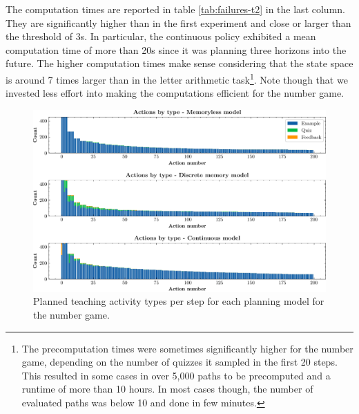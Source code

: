 
The computation times are reported in table \ref{tab:failures-t2} in the last column. 
They are significantly higher than in the first experiment and close or larger than the threshold of 3s. 
In particular, the continuous policy exhibited a mean computation time of more than 20s since it was planning three horizons into the future.
The higher computation times make sense considering that the state space is around 7 times larger than in the letter arithmetic task\footnote{The precomputation times were sometimes significantly higher for the number game, depending on the number of quizzes it sampled in the first 20 steps. This resulted in some cases in over 5,000 paths to be precomputed and a runtime of more than 10 hours. In most cases though, the number of evaluated paths was below 10 and done in few minutes.}.
Note though that we invested less effort into making the computations efficient for the number game.

\begin{figure}
    \centering
    \includegraphics[width=\linewidth]{figures/ng-actions-pre.pdf}
    \caption{Planned teaching activity types per step for each planning model for the number game. 
    }
    \label{fig:actions-t2}
\end{figure}

